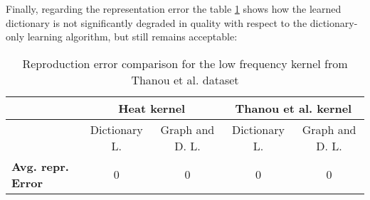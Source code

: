 Finally, regarding the representation error the table \ref{tab:errorGD} shows how the learned dictionary is not significantly degraded in quality with respect to the dictionary-only learning algorithm, but still remains acceptable:

\begin{table}[htbp]
  \centering
  \begin{tabular}{lcccc}
  &\multicolumn{2}{c}{\textbf{Heat kernel}}&\multicolumn{2}{c}{\textbf{Thanou et al. kernel}}\\
  \toprule
  &Dictionary L. & Graph and D. L. & Dictionary L. & Graph and D. L.\\ %
    \midrule
    \textbf{Avg. repr. Error} & 0 & 0 & 0 & 0\\
    \bottomrule
  \end{tabular}
  \caption{Reproduction error comparison for the low frequency kernel from Thanou et al. dataset}
  \label{tab:errorGD}
\end{table}
